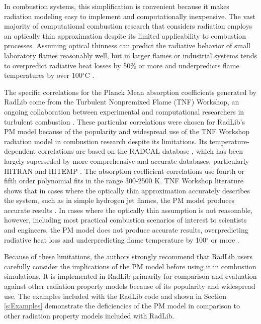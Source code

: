 \documentclass[preprint,12pt]{elsarticle}
\begin{document}
In combustion systems, this simplification is convenient because it makes radiation modeling easy to implement and computationally inexpensive. The vast majority of computational combustion research that considers radiation employs an optically thin approximation despite its limited applicability to combustion processes. Assuming optical thinness can predict the radiative behavior of small laboratory flames reasonably well, but in larger flames or industrial systems tends to overpredict radiative heat losses by 50\% or more and underpredicts flame temperatures by over 100$^{\circ}$C \citep{Modest_2016}. 

The specific correlations for the Planck Mean absorption coefficients generated by RadLib come from the Turbulent Nonpremixed Flame (TNF) Workshop, an ongoing collaboration between experimental and computational researchers in turbulent combustion \citep{Smith_2003,Barlow_2001}. These particular correlations were chosen for RadLib's PM model because of the popularity and widespread use of the TNF Workshop radiation model in combustion research despite its limitations. Its temperature-dependent correlations are based on the RADCAL database \citep{Grosshandler_1993}, which has been largely superseded by more comprehensive and accurate databases, particularly HITRAN and HITEMP \citep{Rothman_2010}. The absorption coefficient correlations use fourth or fifth order polynomial fits in the range 300-2500 K. TNF Workshop literature shows that in cases where the optically thin approximation accurately describes the system, such as in simple hydrogen jet flames, the PM model produces accurate results \citep{Barlow_1999}. In cases where the optically thin assumption is not reasonable, however, including most practical combustion scenarios of interest to scientists and engineers, the PM model does not produce accurate results, overpredicting radiative heat loss and underpredicting flame temperature by 100$^{\circ}$ or more \cite{Frank_2000,Zhu_2002,Coelho_2002}. 

Because of these limitations, the authors strongly recommend that RadLib users carefully consider the implications of the PM model before using it in combustion simulations. It is implemented in RadLib primarily for comparison and evaluation against other radiation property models because of its popularity and widespread use. The examples included with the RadLib code and shown in Section \ref{s:Examples} demonstrate the deficiencies of the PM model in comparison to other radiation property models included with RadLib.
\end{document}
